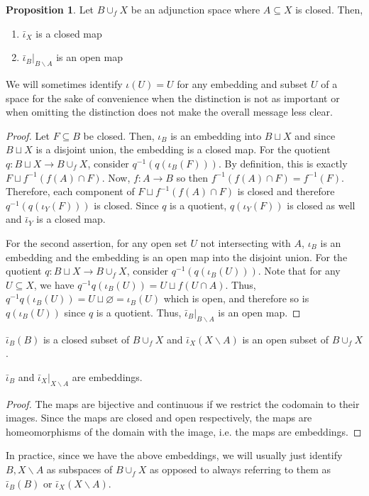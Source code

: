 \documentclass[12pt,reqno]{amsart}
\numberwithin{theorem}{section}
\theoremstyle{definition}
\theoremstyle{remark}
\numberwithin{equation}{section}
\theoremstyle{definition}
\newtheorem{prop}[theorem]{Proposition}
\begin{document}
\begin{prop}
    Let $B\cup _f X$ be an adjunction space where $A\subseteq X$ is closed. Then, \begin{enumerate}
        \item $\bar \iota_X$ is a closed map
        \item $\bar \iota_B|_{B\backslash A}$ is an open map
    \end{enumerate}
\end{prop}
We will sometimes identify $\iota(U) = U$ for any embedding and subset $U$ of a space for the sake of convenience when the distinction is not as important or when omitting the distinction does not make the overall message less clear.
\begin{proof}
    Let $F \subseteq B$ be closed. Then, $\iota_B$ is an embedding into $B\sqcup X$ and since $B\sqcup X$ is a disjoint union, the embedding is a closed map. For the quotient $q:B\sqcup X\rightarrow B\cup_fX$, consider $q^{-1}(q(\iota_B(F)))$. By definition, this is exactly $F\sqcup f^{-1}(f(A)\cap F) $. Now, $f:A\rightarrow B$ so then $f^{-1}(f(A)\cap F) = f^{-1}(F) $. Therefore, each component of $F\sqcup  f^{-1}(f(A)\cap F)$ is closed and therefore $q^{-1}(q(\iota_Y(F)))$ is closed. Since $q$ is a quotient, $q(\iota_Y(F))$ is closed as well and $\bar \iota_Y$ is a closed map.

    For the second assertion, for any open set $U$ not intersecting with $A$, $\iota_B$ is an embedding and the embedding is an open map into the disjoint union. For the quotient $q:B\sqcup X\rightarrow B\cup_fX$, consider $q^{-1}(q(\iota_B(U)))$. Note that for any $U \subseteq X$, we have $q^{-1}q(\iota_B(U)) =  U\sqcup f(U\cap A)$. Thus, $q^{-1}q(\iota_B(U)) =  U\sqcup \varnothing = \iota_B(U)$ which is open, and therefore so is $q(\iota_B(U))$ since $q$ is a quotient. Thus, $\bar \iota_B|_{B\backslash A}$ is an open map.
\end{proof}
\begin{corollary}
    $\bar \iota_B(B)$ is a closed subset of $B\cup_f X$ and $\bar \iota_X(X\backslash A)$ is an open subset of $B \cup_f X$.
\end{corollary}
\begin{corollary}\label{corollary1}
$\bar \iota_B$ and $\bar \iota_{X}|_{X\backslash A} $ are embeddings.
\end{corollary}
\begin{proof}
    The maps are bijective and continuous if we restrict the codomain to their images. Since the maps are closed and open respectively, the maps are homeomorphisms of the domain with the image, i.e. the maps are embeddings.
\end{proof}
In practice, since we have the above embeddings, we will usually just identify $B, X\backslash A$ as subspaces of $B\cup_f X$ as opposed to always referring to them as $\bar \iota_B(B)$ or $
\bar \iota_X(X\backslash A)$.
\end{document}
